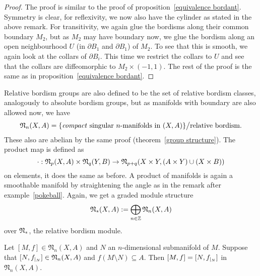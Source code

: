 \documentclass[a4paper,12pt]{article}
\begin{document}
\begin{proof}
    The proof is similar to the proof of proposition\ \ref{equivalence bordant}. 
    Symmetry is clear, for reflexivity, we now also have the cylinder as stated in the above remark. 
    For transitivity, we again glue the bordisms along their common boundary \(M_2\), but as \(M_2\) may have boundary now, we glue the bordism along an open neighbourhood \(U\) (in \(\partial B_1\) and \(\partial B_1\)) of \(M_2\). 
    To see that this is smooth, we again look at the collars of \(\partial B_i\). This time we restrict the collars to \(U\) and see that the collars are diffeomorphic to \(M_2\times(-1,1)\). The rest of the proof is the same as in proposition\ \ref{equivalence bordant}. %
\end{proof}

Relative bordism groups are also defined to be the set of relative bordism classes, analogously to absolute bordism groups, but as manifolds with boundary are also allowed now, we have
\[\mathfrak{N}_n(X,A)=\{\text{\textit{compact} singular $n$-manifolds in $(X,A)$}\}\big/\text{relative bordism}.\]
These also are abelian by the same proof (theorem\ \ref{group structure}). The product map is defined as \[\cdot:\mathfrak{N}_p(X,A)\times\mathfrak{N}_q(Y,B)\to\mathfrak{N}_{p+q}(X\times Y, (A\times Y)\cup(X\times B))\]
on elements, it does the same as before. A product of manifolds is again a smoothable manifold by straightening the angle as in the remark after example\ \ref{pokeball}. Again, we get a graded module structure
\[\mathfrak{N}_\ast(X,A):= \bigoplus_{n\in\mathbb{Z}}\mathfrak{N}_n(X,A)\]
over \(\mathfrak{N}_\ast\), the relative bordism module.

\begin{lemma}\label{almost excision} %
    Let \([M,f]\in\mathfrak{N}_n(X,A)\) and \(N\) an \(n\)-dimensional submanifold of \(M\). 
    Suppose that \([N,f_{|_{N}}]\in\mathfrak{N}_n(X,A)\) and \(f(M\setminus N)\subseteq A\). 
    Then \([M,f]=[N,f_{|_{N}}]\) in \(\mathfrak{N}_n(X,A)\).
\end{lemma}
\end{document}
